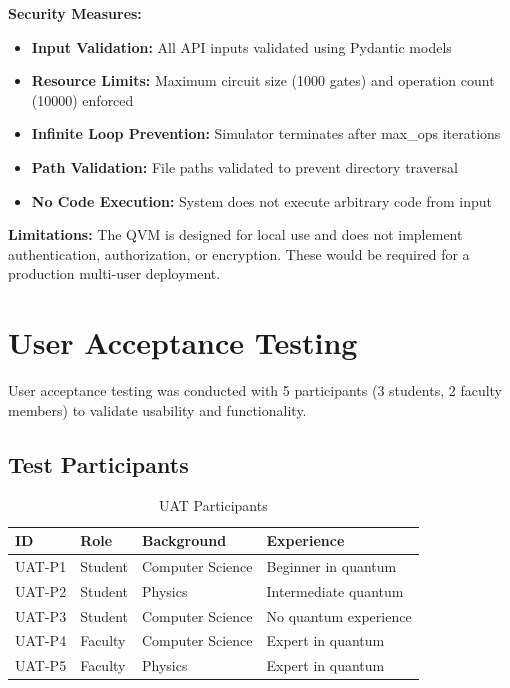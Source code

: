 \textbf{Security Measures:}
\begin{itemize}
\item \textbf{Input Validation:} All API inputs validated using Pydantic models
\item \textbf{Resource Limits:} Maximum circuit size (1000 gates) and operation count (10000) enforced
\item \textbf{Infinite Loop Prevention:} Simulator terminates after max\_ops iterations
\item \textbf{Path Validation:} File paths validated to prevent directory traversal
\item \textbf{No Code Execution:} System does not execute arbitrary code from input
\end{itemize}

\textbf{Limitations:} The QVM is designed for local use and does not implement authentication, authorization, or encryption. These would be required for a production multi-user deployment.

\section{User Acceptance Testing}
User acceptance testing was conducted with 5 participants (3 students, 2 faculty members) to validate usability and functionality.

\subsection{Test Participants}

\begin{table}[h]
\centering
\caption{UAT Participants}
\begin{tabular}{|p{2cm}|p{3cm}|p{4cm}|p{3cm}|}
\hline
\textbf{ID} & \textbf{Role} & \textbf{Background} & \textbf{Experience} \\
\hline
UAT-P1 & Student & Computer Science & Beginner in quantum \\
\hline
UAT-P2 & Student & Physics & Intermediate quantum \\
\hline
UAT-P3 & Student & Computer Science & No quantum experience \\
\hline
UAT-P4 & Faculty & Computer Science & Expert in quantum \\
\hline
UAT-P5 & Faculty & Physics & Expert in quantum \\
\hline
\end{tabular}
\end{table}

